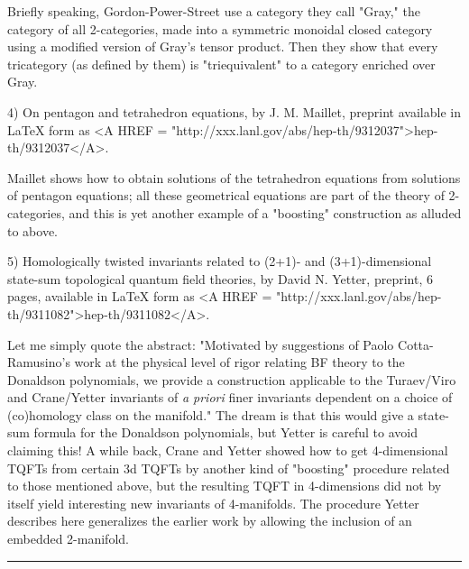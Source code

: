 Briefly speaking, Gordon-Power-Street use a category they call
"Gray," the category of all 2-categories, made into a symmetric monoidal
closed category using a modified version of Gray's tensor product.  Then
they show that every tricategory (as defined by them) is "triequivalent"
to a category enriched over Gray.  

4) On pentagon and tetrahedron equations, by J. M. Maillet, preprint
available in LaTeX form as <A HREF = "http://xxx.lanl.gov/abs/hep-th/9312037">hep-th/9312037</A>.
 
Maillet shows how to obtain solutions of the tetrahedron equations from 
solutions of pentagon equations; all these geometrical equations are
part of the theory of 2-categories, and this is yet another example of a
"boosting" construction as alluded to above.  

5) Homologically twisted invariants related to (2+1)- and (3+1)-dimensional
state-sum topological quantum field theories, by David N. Yetter,
preprint, 6 pages, available in LaTeX form as <A HREF = "http://xxx.lanl.gov/abs/hep-th/9311082">hep-th/9311082</A>.

Let me simply quote the abstract: "Motivated by suggestions of Paolo
Cotta-Ramusino's work at the physical level of rigor relating BF theory
to the Donaldson polynomials, we provide a construction applicable to
the Turaev/Viro and Crane/Yetter invariants of \emph{a priori} finer
invariants dependent on a choice of (co)homology class on the manifold."
The dream is that this would give a state-sum formula for the Donaldson
polynomials, but Yetter is careful to avoid claiming this!  A while
back, Crane and Yetter showed how to get 4-dimensional TQFTs from certain 3d
TQFTs by another kind of "boosting" procedure related to those mentioned
above, but the resulting TQFT in 4-dimensions did not by itself yield
interesting new invariants of 4-manifolds.  The procedure Yetter
describes here generalizes the earlier work by allowing the inclusion of
an embedded 2-manifold.  
\par\noindent\rule{\textwidth}{0.4pt}

